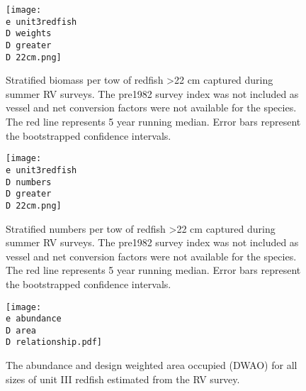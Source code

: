 \documentclass[11pt]{article}
\newcommand{\D}{.}
\newcommand{\e}{/home/ecomod_data/redfish/figures/}
\begin{document}
\begin{figure}
\centering
    
    \texttt{[image: \\e unit3redfish\\D weights\\D greater\\D 22cm.png]}
    \caption{Stratified biomass per tow of redfish \textgreater 22 cm captured during summer RV surveys. The pre1982 survey index was not included as vessel and net conversion factors were not available for the species. The red line represents 5 year running median. Error bars represent the bootstrapped confidence intervals.}

\end{figure}
%
%
\begin{figure}
\centering
    
    \texttt{[image: \\e unit3redfish\\D numbers\\D greater\\D 22cm.png]}
    \caption{Stratified numbers per tow of redfish \textgreater 22 cm  captured during summer RV surveys. The pre1982 survey index was not included as vessel and net conversion factors were not available for the species. The red line represents 5 year running median. Error bars represent the bootstrapped confidence intervals.}

\end{figure}
\clearpage

\begin{figure}
  \texttt{[image: \\e abundance\\D area\\D relationship.pdf]}
    \caption{The abundance and design weighted area occupied (DWAO) for all sizes of unit III redfish estimated from the RV survey.}

\end{figure}
\end{document}
